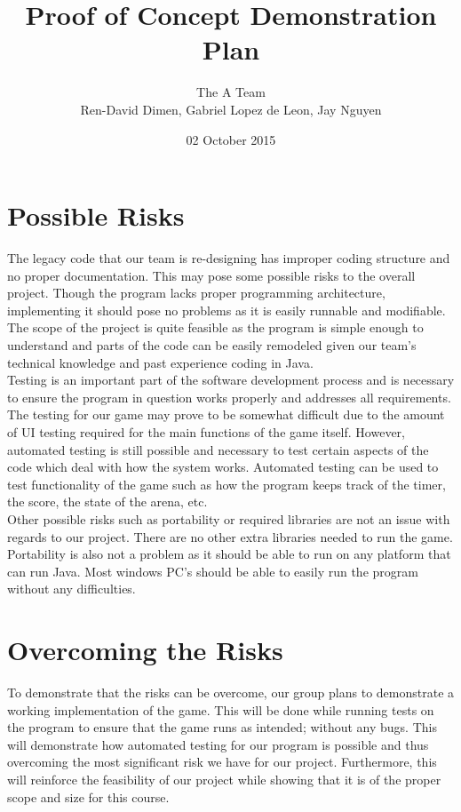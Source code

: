 \documentclass[12pt]{article}
\begin{document}
	
\title{\textbf{Proof of Concept Demonstration Plan}}
\author{The A Team\\ \small Ren-David Dimen, Gabriel Lopez de Leon, Jay Nguyen}
\date{02 October 2015}
\maketitle

\section*{Possible Risks}

The legacy code that our team is re-designing has improper coding structure and no proper documentation. This may pose some possible risks to the overall project. Though the program lacks proper programming architecture, implementing it should pose no problems as it is easily runnable and modifiable. The scope of the project is quite feasible as the program is simple enough to understand and parts of the code can be easily remodeled given our team's technical knowledge and past experience coding in Java. \\

Testing is an important part of the software development process and is necessary to ensure the program in question works properly and addresses all requirements. The testing for our game may prove to be somewhat difficult due to the amount of UI testing required for the main functions of the game itself. However, automated testing is still possible and necessary to test certain aspects of the code which deal with how the system works. Automated testing can be used to test functionality of the game such as how the program keeps track of the timer, the score, the state of the arena, etc. \\

Other possible risks such as portability or required libraries are not an issue with regards to our project. There are no other extra libraries needed to run the game. Portability is also not a problem as it should be able to run on any platform that can run Java. Most windows PC's should be able to easily run the program without any difficulties. \\

\section*{Overcoming the Risks}

To demonstrate that the risks can be overcome, our group plans to demonstrate a working implementation of the game. This will be done while running tests on the program to ensure that the game runs as intended; without any bugs. This will demonstrate how automated testing for our program is possible and thus overcoming the most significant risk we have for our project. Furthermore, this will reinforce the feasibility of our project while showing that it is of the proper scope and size for this course.
\end{document}
